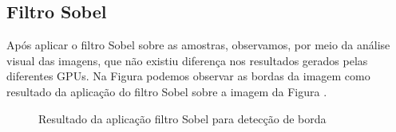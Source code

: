 \subsection{Filtro Sobel}
Após aplicar o filtro Sobel sobre as amostras, observamos, por meio da análise visual das imagens, que não existiu diferença nos resultados gerados pelas diferentes GPUs. Na Figura  podemos observar as bordas da imagem como  resultado da aplicação do filtro Sobel sobre a imagem da Figura .   
\begin{figure}[!ht]
\centering
{}
\label{fig:sobel_filtro}
\caption{Resultado da aplicação filtro Sobel para detecção de borda}
\end{figure}

\FloatBarrier
